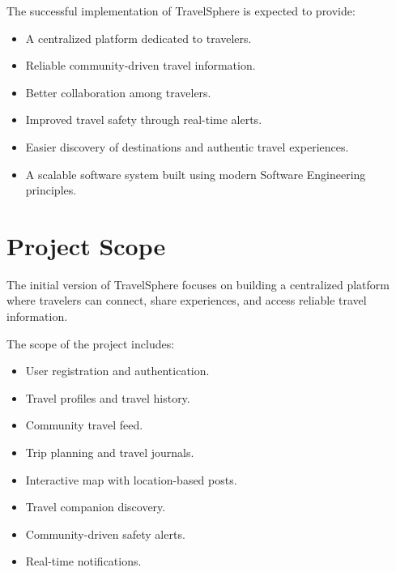 \documentclass[12pt,a4paper]{article}
\begin{document}
The successful implementation of TravelSphere is expected to provide:

\begin{itemize}

\item A centralized platform dedicated to travelers.

\item Reliable community-driven travel information.

\item Better collaboration among travelers.

\item Improved travel safety through real-time alerts.

\item Easier discovery of destinations and authentic travel experiences.

\item A scalable software system built using modern Software Engineering principles.

\end{itemize}


\section{Project Scope}

The initial version of TravelSphere focuses on building a centralized platform where travelers can connect, share experiences, and access reliable travel information.

The scope of the project includes:

\begin{itemize}

\item User registration and authentication.

\item Travel profiles and travel history.

\item Community travel feed.

\item Trip planning and travel journals.

\item Interactive map with location-based posts.

\item Travel companion discovery.

\item Community-driven safety alerts.

\item Real-time notifications.

\end{itemize}
\end{document}
